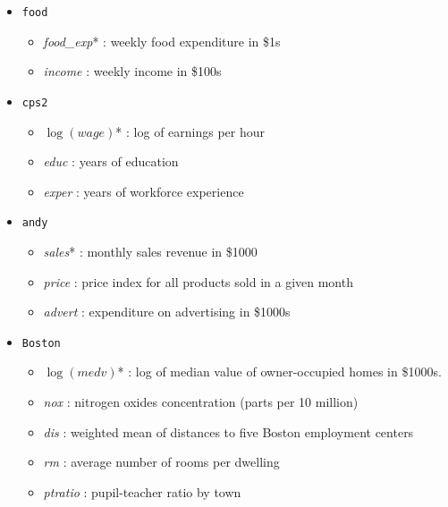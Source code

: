 \documentclass[12pt]{article}
\begin{document}
\begin{itemize}[noitemsep]
    \item \texttt{food}
    \begin{itemize}[noitemsep]
        \item \textit{food\_exp}* : weekly food expenditure in \$1s
        \item \textit{income} : weekly income in \$100s
    \end{itemize}
    \item \texttt{cps2}
    \begin{itemize}[noitemsep]
        \item $\log(\textit{wage})$* : log of earnings per hour
        \item \textit{educ} : years of education
        \item \textit{exper} : years of workforce experience
    \end{itemize}
    \item \texttt{andy}
    \begin{itemize}[noitemsep]
        \item \textit{sales}* : monthly sales revenue in \$1000
        \item \textit{price} : price index for all products sold in a given month
        \item \textit{advert} : expenditure on advertising in \$1000s
    \end{itemize}
    \item \texttt{Boston}
    \begin{itemize}[noitemsep]
        \item $\log(\textit{medv})$* : log of median value of owner-occupied homes in \$1000s.
        \item \textit{nox} : nitrogen oxides concentration (parts per 10 million)
        \item \textit{dis} : weighted mean of distances to five Boston employment centers
        \item \textit{rm} : average number of rooms per dwelling
        \item \textit{ptratio} : pupil-teacher ratio by town
    \end{itemize}
\end{itemize}
\end{document}
